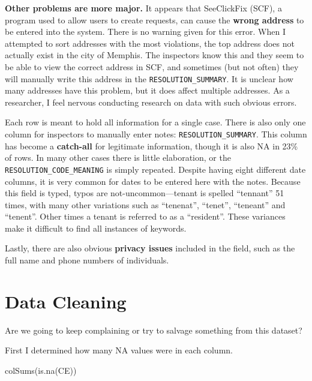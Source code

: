 \documentclass[
]{book}
\newenvironment{Shaded}{\begin{snugshade}}{\end{snugshade}}
\newcommand{\FunctionTok}[1]{\textcolor[rgb]{0.00,0.00,0.00}{#1}}
\newcommand{\NormalTok}[1]{#1}
\begin{document}
\textbf{Other problems are more major.} It appears that SeeClickFix (SCF), a program used to allow users to create requests, can cause the \textbf{wrong address} to be entered into the system. There is no warning given for this error. When I attempted to sort addresses with the most violations, the top address does not actually exist in the city of Memphis. The inspectors know this and they seem to be able to view the correct address in SCF, and sometimes (but not often) they will manually write this address in the \texttt{RESOLUTION\_SUMMARY}. It is unclear how many addresses have this problem, but it does affect multiple addresses. As a researcher, I feel nervous conducting research on data with such obvious errors.

Each row is meant to hold all information for a single case. There is also only one column for inspectors to manually enter notes: \texttt{RESOLUTION\_SUMMARY}. This column has become a \textbf{catch-all} for legitimate information, though it is also NA in 23\% of rows. In many other cases there is little elaboration, or the \texttt{RESOLUTION\_CODE\_MEANING} is simply repeated. Despite having eight different date columns, it is very common for dates to be entered here with the notes. Because this field is typed, typos are not-uncommon---tenant is spelled ``tennant'' 51 times, with many other variations such as ``tenenat'', ``tenet'', ``teneant'' and ``tenent''. Other times a tenant is referred to as a ``resident''. These variances make it difficult to find all instances of keywords.

Lastly, there are also obvious \textbf{privacy issues} included in the field, such as the full name and phone numbers of individuals.

\hypertarget{data-cleaning}{%
\section{Data Cleaning}\label{data-cleaning}}

Are we going to keep complaining or try to salvage something from this dataset?

First I determined how many NA values were in each column.

\begin{Shaded}
\begin{Highlighting}[]
\FunctionTok{colSums}\NormalTok{(}\FunctionTok{is.na}\NormalTok{(CE))}
\end{Highlighting}
\end{Shaded}
\end{document}
